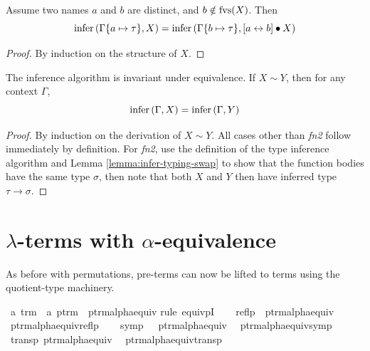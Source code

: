 \begin{lemma}
\label{lemma:infer-typing-swap}
Assume two names \(a\) and \(b\) are distinct, and \(b \notin \mathrm{fvs}(X)\).
Then
\[
\mathrm{infer}\left(\Gamma\{a \mapsto \tau\}, X\right) = \mathrm{infer}\left(\Gamma\{b \mapsto \tau\}, [a \leftrightarrow b] \bullet X\right)
\]
\end{lemma}
\begin{proof}
By induction on the structure of \(X\).
\end{proof}

\begin{theorem}
The inference algorithm is invariant under equivalence.
If \(X \sim Y\), then for any context \(\Gamma\),
\[
\mathrm{infer}\left(\Gamma, X\right) = \mathrm{infer}\left(\Gamma, Y\right)
\]
\end{theorem}
\begin{proof}
By induction on the derivation of \(X \sim Y\).
All cases other than \emph{fn2} follow immediately by definition.
For \emph{fn2}, use the definition of the type inference algorithm and Lemma \ref{lemma:infer-typing-swap} to show that the function bodies have the same type \(\sigma\), then note that both \(X\) and \(Y\) then have inferred type \(\tau \to \sigma\).
\end{proof}

\section{\(\lambda\)-terms with \(\alpha\)-equivalence}
\label{sec:quotient-terms}
As before with permutations, pre-terms can now be lifted to terms using the quotient-type machinery.

\begin{implementation}
\isamarkupfalse%
\ {\isacharprime}a\ trm\ {\isacharequal}\ {\isachardoublequoteopen}{\isacharprime}a\ ptrm{\isachardoublequoteclose}\ {\isacharslash}\ ptrm{\isacharunderscore}alpha{\isacharunderscore}equiv\isanewline
%
\isadelimproof
%
\endisadelimproof
%
\isatagproof
{}\isamarkupfalse%
{\isacharparenleft}rule\ equivpI{\isacharparenright}\isanewline
\ \ \isamarkupfalse%
\ {\isachardoublequoteopen}reflp\ \ ptrm{\isacharunderscore}alpha{\isacharunderscore}equiv{\isachardoublequoteclose}\ \isamarkupfalse%
\ ptrm{\isacharunderscore}alpha{\isacharunderscore}equiv{\isacharunderscore}reflp\isacommand{{\isachardot}}\isamarkupfalse%
\isanewline
\ \ \isamarkupfalse%
\ {\isachardoublequoteopen}symp\ \ \ ptrm{\isacharunderscore}alpha{\isacharunderscore}equiv{\isachardoublequoteclose}\ \isamarkupfalse%
\ ptrm{\isacharunderscore}alpha{\isacharunderscore}equiv{\isacharunderscore}symp\isacommand{{\isachardot}}\isamarkupfalse%
\isanewline
\ \ \isamarkupfalse%
\ {\isachardoublequoteopen}transp\ ptrm{\isacharunderscore}alpha{\isacharunderscore}equiv{\isachardoublequoteclose}\ \isamarkupfalse%
\ ptrm{\isacharunderscore}alpha{\isacharunderscore}equiv{\isacharunderscore}transp\isacommand{{\isachardot}}\isamarkupfalse%
\isanewline
{}\isamarkupfalse%
%
\endisatagproof
\end{implementation}

